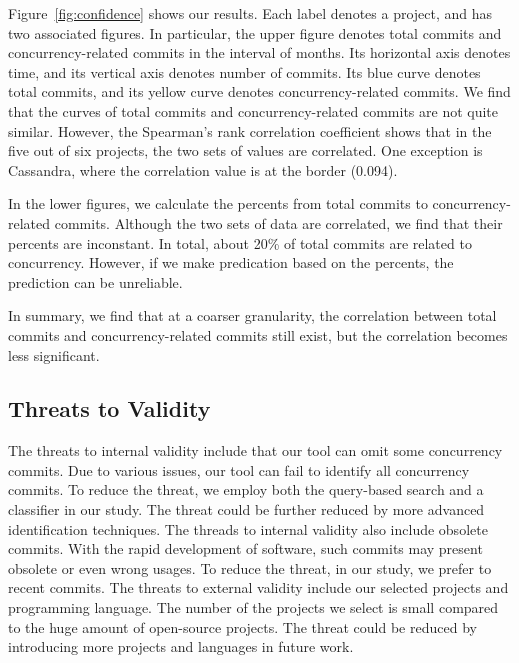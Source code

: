 Figure~\ref{fig:confidence} shows our results. Each label denotes a project, and has two associated figures. In particular, the upper figure denotes total commits and concurrency-related commits in the interval of months. Its horizontal axis denotes time, and its vertical axis denotes number of commits. Its blue curve denotes total commits, and its yellow curve denotes concurrency-related commits. We find that the curves of total commits and concurrency-related commits are not quite similar. However, the Spearman's rank
correlation coefficient shows that in the five out of six projects, the two sets of values are correlated. One exception is Cassandra, where the correlation value is at the border (0.094).

In the lower figures, we calculate the percents from total commits to concurrency-related commits. Although the two sets of data are correlated, we find that their percents are inconstant. In total, about 20\% of total commits are related to concurrency. However, if we make predication based on the percents, the prediction can be unreliable.

In summary, we find that at a coarser granularity, the correlation between total commits and concurrency-related commits still exist, but the correlation becomes less significant.






\subsection{Threats to Validity}

The threats to internal validity include that our tool can omit some concurrency commits. Due to various issues, our tool can fail to identify all concurrency commits. To reduce the threat, we employ both the query-based search and a classifier in our study. The threat could be further reduced by more advanced identification techniques. The threads to internal validity also include obsolete commits. With the rapid development of software, such commits may present obsolete or even wrong usages. To reduce the threat, in our study, we prefer to recent commits. The threats to external validity include our selected projects and programming language. The number of the projects we select is small compared to the huge amount of open-source projects. The threat could be reduced by introducing more projects and languages in future work.

